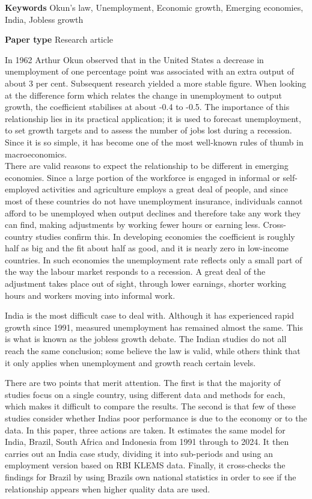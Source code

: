 \documentclass[12pt]{article}
\newcommand{\hone}[2]{\par\Needspace{4\baselineskip}\vspace{2pt}{\noindent\raggedright\bfseries
  \ifx\relax#1\relax\else\makebox[0.5in][l]{#1}\fi #2\par}\nopagebreak\vspace{-2pt}}
\begin{document}
\textbf{Keywords} Okun’s law, Unemployment, Economic growth, Emerging economies, India, Jobless growth


\textbf{Paper type} Research article


\hone{1}{Introduction}

In 1962 Arthur Okun observed that in the United States a decrease in unemployment of one percentage point was associated with an extra output of about 3 per cent. Subsequent research yielded a more stable figure. When looking at the difference form which relates the change in unemployment to output growth, the coefficient stabilises at about -0.4 to -0.5. The importance of this relationship lies in its practical application; it is used to forecast unemployment, to set growth targets and to assess the number of jobs lost during a recession. Since it is so simple, it has become one of the most well-known rules of thumb in macroeconomics.\\
There are valid reasons to expect the relationship to be different in emerging economies. Since a large portion of the workforce is engaged in informal or self-employed activities and agriculture employs a great deal of people, and since most of these countries do not have unemployment insurance, individuals cannot afford to be unemployed when output declines and therefore take any work they can find, making adjustments by working fewer hours or earning less. Cross-country studies confirm this. In developing economies the coefficient is roughly half as big and the fit about half as good, and it is nearly zero in low-income countries. In such economies the unemployment rate reflects only a small part of the way the labour market responds to a recession. A great deal of the adjustment takes place out of sight, through lower earnings, shorter working hours and workers moving into informal work.


India is the most difficult case to deal with. Although it has experienced rapid growth since 1991, measured unemployment has remained almost the same. This is what is known as the \textquotesingle{}jobless growth\textquotesingle{} debate. The Indian studies do not all reach the same conclusion; some believe the law is valid, while others think that it only applies when unemployment and growth reach certain levels. 


There are two points that merit attention. The first is that the majority of studies focus on a single country, using different data and methods for each, which makes it difficult to compare the results. The second is that few of these studies consider whether India\textquotesingle{}s poor performance is due to the economy or to the data. In this paper, three actions are taken. It estimates the same model for India, Brazil, South Africa and Indonesia from 1991 through to 2024. It then carries out an India case study, dividing it into sub-periods and using an employment version based on RBI KLEMS data. Finally, it cross-checks the findings for Brazil by using Brazil\textquotesingle{}s own national statistics in order to see if the relationship appears when higher quality data are used. 
\end{document}
